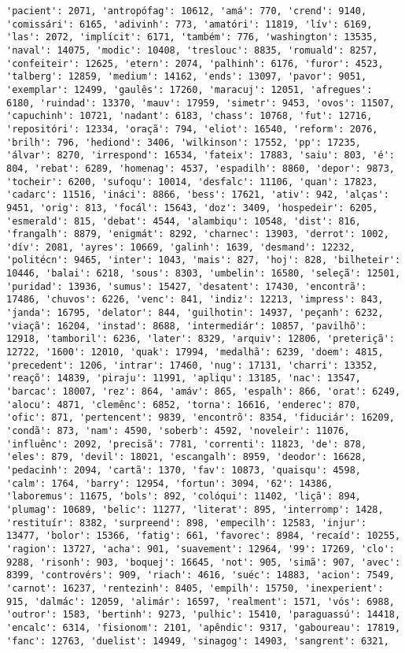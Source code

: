 \begin{Verbatim}[commandchars=\\\{\}]
'pacient': 2071, 'antropófag': 10612, 'amá': 770, 'crend': 9140, 'comissári': 6165, 'adivinh': 773, 'amatóri': 11819, 'lív': 6169, 'las': 2072, 'implícit': 6171, 'também': 776, 'washington': 13535, 'naval': 14075, 'modic': 10408, 'treslouc': 8835, 'romuald': 8257, 'confeiteir': 12625, 'etern': 2074, 'palhinh': 6176, 'furor': 4523, 'talberg': 12859, 'medium': 14162, 'ends': 13097, 'pavor': 9051, 'exemplar': 12499, 'gaulês': 17260, 'maracuj': 12051, 'afregues': 6180, 'ruindad': 13370, 'mauv': 17959, 'simetr': 9453, 'ovos': 11507, 'capuchinh': 10721, 'nadant': 6183, 'chass': 10768, 'fut': 12716, 'repositóri': 12334, 'oraçã': 794, 'eliot': 16540, 'reform': 2076, 'brilh': 796, 'hediond': 3406, 'wilkinson': 17552, 'pp': 17235, 'álvar': 8270, 'irrespond': 16534, 'fateix': 17883, 'saiu': 803, 'é': 804, 'rebat': 6289, 'homenag': 4537, 'espadilh': 8860, 'depor': 9873, 'tocheir': 6200, 'sufoqu': 10014, 'desfalc': 11106, 'quan': 17823, 'cadarc': 11516, 'ináci': 8866, 'bess': 17621, 'ativ': 942, 'alças': 9451, 'orig': 813, 'focál': 15643, 'doz': 3409, 'hospedeir': 6205, 'esmerald': 815, 'debat': 4544, 'alambiqu': 10548, 'dist': 816, 'frangalh': 8879, 'enigmát': 8292, 'charnec': 13903, 'derrot': 1002, 'dív': 2081, 'ayres': 10669, 'galinh': 1639, 'desmand': 12232, 'politécn': 9465, 'inter': 1043, 'mais': 827, 'hoj': 828, 'bilheteir': 10446, 'balai': 6218, 'sous': 8303, 'umbelin': 16580, 'seleçã': 12501, 'puridad': 13936, 'sumus': 15427, 'desatent': 17430, 'encontrã': 17486, 'chuvos': 6226, 'venc': 841, 'indiz': 12213, 'impress': 843, 'janda': 16795, 'delator': 844, 'guilhotin': 14937, 'peçanh': 6232, 'viaçã': 16204, 'instad': 8688, 'intermediár': 10857, 'pavilhõ': 12918, 'tamboril': 6236, 'later': 8329, 'arquiv': 12806, 'preteriçã': 12722, '1600': 12010, 'quak': 17994, 'medalhã': 6239, 'doem': 4815, 'precedent': 1206, 'intrar': 17460, 'nug': 17131, 'charri': 13352, 'reaçõ': 14839, 'piraju': 11991, 'apliqu': 13185, 'nac': 13547, 'barcac': 18007, 'rez': 864, 'amáv': 865, 'espalh': 866, 'orat': 6249, 'alocu': 4871, 'clemênc': 6852, 'torna': 16616, 'enderec': 870, 'ofic': 871, 'pertencent': 9839, 'encontrõ': 8354, 'fiduciár': 16209, 'condã': 873, 'nam': 4590, 'soberb': 4592, 'noveleir': 11076, 'influênc': 2092, 'precisã': 7781, 'correnti': 11823, 'de': 878, 'eles': 879, 'devil': 18021, 'escangalh': 8959, 'deodor': 16628, 'pedacinh': 2094, 'cartã': 1370, 'fav': 10873, 'quaisqu': 4598, 'calm': 1764, 'barry': 12954, 'fortun': 3094, '62': 14386, 'laboremus': 11675, 'bols': 892, 'colóqui': 11402, 'liçã': 894, 'plumag': 10689, 'belic': 11277, 'literat': 895, 'interromp': 1428, 'restituír': 8382, 'surpreend': 898, 'empecilh': 12583, 'injur': 13477, 'bolor': 15366, 'fatig': 661, 'favorec': 8984, 'recaíd': 10255, 'ragion': 13727, 'acha': 901, 'suavement': 12964, '99': 17269, 'clo': 9288, 'risonh': 903, 'boquej': 16645, 'not': 905, 'simã': 907, 'avec': 8399, 'controvérs': 909, 'riach': 4616, 'suéc': 14883, 'acion': 7549, 'carnot': 16237, 'rentezinh': 8405, 'empilh': 15750, 'inexperient': 915, 'dalmác': 12059, 'alimár': 16597, 'realment': 1571, 'vós': 6988, 'outror': 1583, 'bertinh': 9273, 'pulhic': 15410, 'paraguassú': 14418, 'encalc': 6314, 'fisionom': 2101, 'apêndic': 9317, 'gaboureau': 17819, 'fanc': 12763, 'duelist': 14949, 'sinagog': 14903, 'sangrent': 6321, 
\end{Verbatim}

